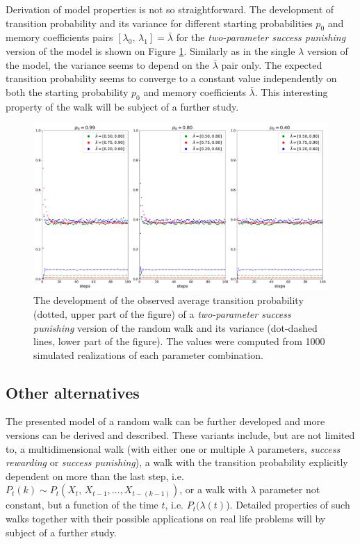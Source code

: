 \documentclass{amsart}
\theoremstyle{definition}
\theoremstyle{plain}
\theoremstyle{plain}
\theoremstyle{plain}
\numberwithin{equation}{section}
\begin{document}
Derivation of model properties is not so straightforward. The development
of transition probability and its variance for different starting
probabilities $p_{0}$ and memory coefficients pairs $ [\lambda_{0},\,\lambda_{1}]=\bar{\lambda}$
for the \emph{two-parameter success punishing} version of the model
is shown on Figure \ref{fig:Development-punish2l}. Similarly as in
the single $\lambda$ version of the model, the variance seems to
depend on the $\bar{\lambda}$ pair only. The expected transition
probability seems to converge to a constant value independently on
both the starting probability $p_{0}$ and memory coefficients $\bar{\lambda}$.
This interesting property of the walk will be subject of a further study.

\begin{figure}
 \begin{center}
\includegraphics[width=1\textwidth]{../simulations/e_probability_1000_walks_100_steps_type_success_punished_two_lambdas}
\caption{\label{fig:Development-punish2l}The development of the observed average
transition probability (dotted, upper part of the figure) of a \emph{two-parameter success
punishing} version of the random walk and its variance (dot-dashed lines, lower part of the figure). The values
were computed from 1000 simulated realizations of each parameter
combination.}
 \end{center}
\end{figure}


\subsection{Other alternatives}

The presented model of a random walk can be further developed and
more versions can be derived and described. These variants include,
but are not limited to, a multidimensional walk (with either one or multiple
$\lambda$ parameters, \emph{success rewarding} or \emph{success
punishing}), a walk with the transition probability explicitly dependent
on more than the last step, i.e. $P_{t}(k)\sim P_{t}(X_{t},\,X_{t-1},\dots,X_{t-(k-1)})$,
or a walk with $\lambda$ parameter not constant, but a function
of the time $t$, i.e. $P_{t}(\lambda(t)$). Detailed properties of
such walks together with their possible applications on real life
problems will by subject of a further study.
\end{document}
